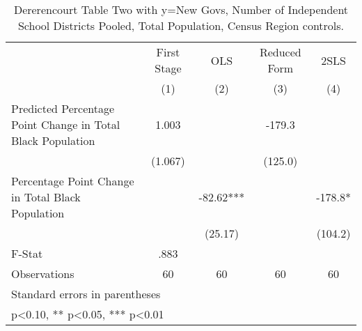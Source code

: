 \begin{table}[htbp]\centering
\def\sym#1{\ifmmode^{#1}\else\(^{#1}\)\fi}
\caption{Dererencourt Table Two with y=New Govs, Number of Independent School Districts  Pooled, Total Population, Census Region controls.}
\begin{tabular}{l*{4}{c}}
\toprule
                    & First Stage   &         OLS   &Reduced Form   &        2SLS   \\
                    &\multicolumn{1}{c}{(1)}   &\multicolumn{1}{c}{(2)}   &\multicolumn{1}{c}{(3)}   &\multicolumn{1}{c}{(4)}   \\
\midrule
Predicted Percentage Point Change in Total Black Population&       1.003   &               &      -179.3   &               \\
                    &     (1.067)   &               &     (125.0)   &               \\
\addlinespace
Percentage Point Change in Total Black Population&               &      -82.62***&               &      -178.8*  \\
                    &               &     (25.17)   &               &     (104.2)   \\
\midrule
F-Stat              &        .883   &               &               &               \\
Observations        &          60   &          60   &          60   &          60   \\
\bottomrule
\multicolumn{5}{l}{\footnotesize Standard errors in parentheses}\\
\multicolumn{5}{l}{\footnotesize * p<0.10, ** p<0.05, *** p<0.01}\\
\end{tabular}
\end{table}
